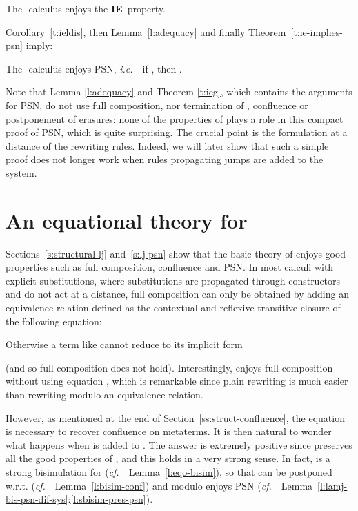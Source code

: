 \documentclass{LMCS}
\newcommand{\ie}{{\it  i.e.}~}
\newcommand{\cf}{{\it  cf.}~}
\renewcommand{\>}{\rightarrow}
\newcommand{\iep}{{\bf IE}}
\begin{document}
\begin{cor}[\iep\ for ]
\label{t:ieldis}
The -calculus enjoys the \iep\ property.
\end{cor}


Corollary~\ref{t:ieldis}, then Lemma~\ref{l:adequacy}
and finally  Theorem~\ref{t:ie-implies-psn} imply:

\begin{cor}
\label{coro:struct-psn-lj}
The -calculus enjoys PSN, \ie\ if , then .
\end{cor}

Note that Lemma \ref{l:adequacy} and Theorem \ref{t:ieg}, which
contains the arguments for PSN, do not use full composition, nor
termination of , confluence or postponement of erasures:
none of the properties of  plays a role in this compact proof of
PSN, which is quite surprising. The crucial point is the formulation
at a distance of the rewriting rules. Indeed, we will later show that
such a simple proof does not longer work when rules propagating jumps
are added to the system.

\section{An equational theory for }
\label{s:eq-th}
Sections~\ref{s:structural-lj} and~\ref{s:lj-psn} show  that the basic
theory of  enjoys good properties such as full composition,
confluence and PSN. In most calculi with explicit
substitutions, where substitutions are propagated through constructors
and do not act at a distance, full composition can only be obtained by
adding an equivalence relation  defined as the contextual and
reflexive-transitive closure of the following equation:
 
Otherwise  a term like  cannot reduce to its implicit form 

(and so full
composition does not hold). Interestingly,  enjoys full
composition without using equation , which is remarkable since 
plain
rewriting is much easier than rewriting
modulo an equivalence relation.\medskip

However, as mentioned at the end of
Section~\ref{ss:struct-confluence}, the equation  is necessary to
recover confluence on metaterms.  It is then natural to wonder what
happens when  is added to . The answer is extremely
positive since  preserves all the good properties of ,
and this holds in a very strong sense. In fact,  is a strong
bisimulation for  (\cf\ Lemma~\ref{l:eqo-bisim}),
so that  can be postponed w.r.t. 
(\cf\ Lemma~\ref{l:bisim-conf})  and  modulo  enjoys
  PSN
  (\cf\ Lemma~\ref{l:lamj-bis-psn-dif-sys}:\ref{l:sbisim-pres-psn}).
\end{document}
